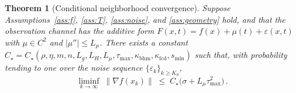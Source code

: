 \documentclass[11pt,a4paper]{article}
\newtheorem{theorem}{Theorem}[section]
\begin{document}
\begin{theorem}[Conditional neighborhood convergence]
\label{thm:conditional-convergence}
Suppose Assumptions~\ref{ass:f}, \ref{ass:T}, \ref{ass:noise},
and \ref{ass:geometry} hold, and that the observation channel
has the additive form
$F(x,t)=f(x)+\mu(t)+\varepsilon(x,t)$ with $\mu\in C^2$ and
$|\mu''|\le L_\mu$. There exists a constant
$C_\star=C_\star(\rho,\eta,m,n,L_g,L_H,L_\mu,\tau_{\max},
\kappa_{\mathrm{bhm}},\kappa_{\mathrm{fcd}},s_{\min})$ such
that, with probability tending to one over the noise sequence
$\{\varepsilon_k\}_{k\ge K_0}$,
\begin{equation}\label{eq:thm-conv}
  \liminf_{k\to\infty}\;\|\nabla f(x_k)\|
  \;\le\;C_\star\bigl(\sigma+L_\mu\tau_{\max}^{2}\bigr)\,.
\end{equation}
\end{theorem}
\end{document}
